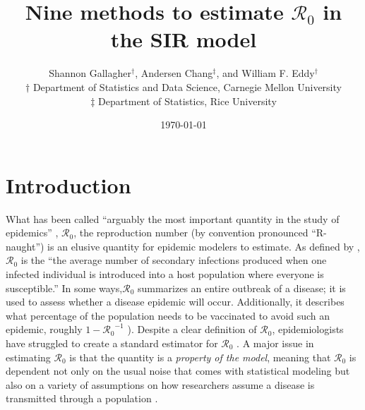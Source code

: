 \documentclass[12pt]{article}
\newcommand{\Wxxsir}{Nine } %
\newcommand{\rr}{\ensuremath{\mathcal{R}_0}}
\begin{document}




\title{\Wxxsir methods to estimate $\rr$ in the SIR model}
\author{ Shannon Gallagher$^{\dag}$, Andersen Chang$^{\ddag}$, and William F. Eddy$^{\dag}$ \\$\dag$ Department of Statistics and Data Science, Carnegie Mellon University\\ $\ddag$ Department of Statistics, Rice University}
\date{\today}
\maketitle



\section{Introduction}\label{sec:intro}
What has been called ``arguably the most important quantity in the study of epidemics'' \citep{Heesterbeek2002},  $\mathcal{R}_0$, the reproduction number (by convention pronounced ``R-naught'') is an elusive quantity for epidemic modelers to estimate.  As defined by \citet{anderson1992}, $\rr$ is the ``the average number of secondary infections produced when one infected individual is introduced into a host population where everyone is susceptible.''  In some ways,$\rr$ summarizes an entire outbreak of a disease; it  is used to assess whether a disease epidemic will occur.  Additionally, it describes what percentage of the population needs to be vaccinated to avoid such an epidemic, roughly $1-\rr^{-1}$ \citep{anderson1992}).  Despite a clear definition of $\rr$, epidemiologists have struggled to create a standard  estimator for $\rr$  \citep{hethcote2000}.  A major issue in estimating $\rr$ is that the quantity is a \textit{property of the model}, meaning that $\rr$ is dependent not only on the usual noise that comes with statistical modeling but also on a variety of assumptions on how researchers assume a disease is transmitted through a population \citep{diekmann2009}.
\end{document}
